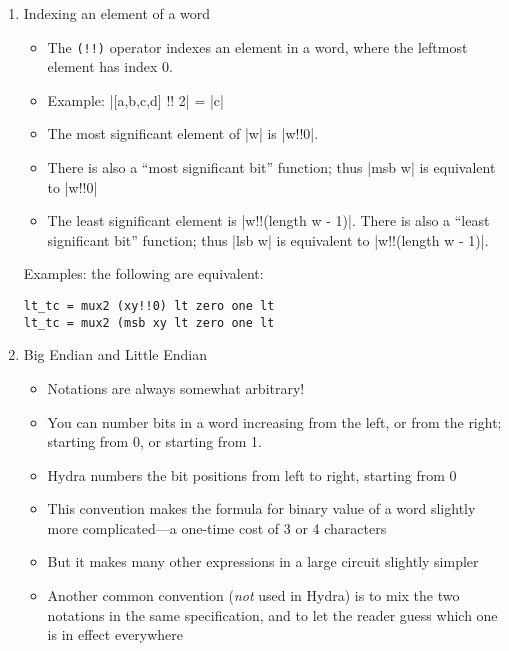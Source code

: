 \documentclass[11pt]{article}
\begin{document}
\begin{enumerate}
\begin{verbatim}
[a,b,c,d] = w
\end{verbatim}

\item Indexing an element of a word
\label{sec:org9c74134}

\begin{itemize}
\item The \texttt{(!!)} operator indexes an element in a word, where
the leftmost element has index 0.
\item Example: |[a,b,c,d] !! 2| = |c|
\item The most significant element of |w| is |w!!0|.
\item There is also a ``most significant bit'' function; thus |msb w|
is equivalent to |w!!0|
\item The least significant element is |w!!(length w - 1)|.  There is
also a ``least significant bit'' function; thus |lsb w| is equivalent
to |w!!(length w - 1)|.
\end{itemize}

Examples: the following are equivalent:

\begin{verbatim}
lt_tc = mux2 (xy!!0) lt zero one lt
lt_tc = mux2 (msb xy lt zero one lt
\end{verbatim}

\item Big Endian and Little Endian
\label{sec:org44a3ac1}

\begin{itemize}
\item Notations are always somewhat arbitrary!
\item You can number bits in a word increasing from the left, or from
the right; starting from 0, or starting from 1.
\item Hydra numbers the bit positions from left to right, starting
from 0
\item This convention makes the formula for binary value of a word
slightly more complicated---a one-time cost of 3 or 4 characters
\item But it makes many other expressions in a large circuit slightly
simpler
\item Another common convention (\emph{not} used in Hydra) is to mix
the two notations in the same specification, and to let the reader
guess which one is in effect everywhere
\end{itemize}
\end{enumerate}
\end{document}
